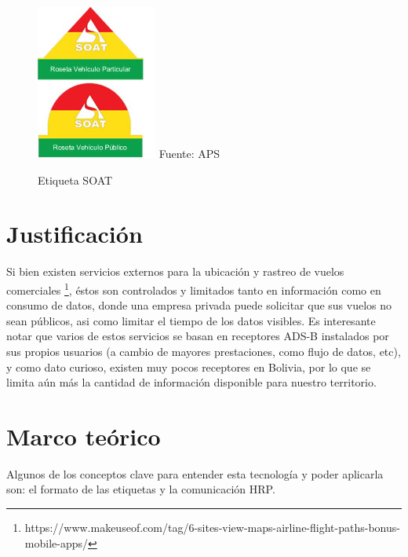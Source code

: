\documentclass[fleqn,10pt]{SelfArx} %
\begin{document}
\begin{figure}[ht]
\caption{Etiqueta SOAT}
\centering
\includegraphics[width=0.6\linewidth]{roseta_soat.jpg}
\newline Fuente: APS
\label{fig:roseta_soat}
\end{figure}

\section{Justificación}

Si bien existen servicios externos para la ubicación y rastreo de vuelos comerciales \footnote{https://www.makeuseof.com/tag/6-sites-view-maps-airline-flight-paths-bonus-mobile-apps/}, éstos son controlados y limitados tanto en información como en consumo de datos, donde una empresa privada puede solicitar que sus vuelos no sean públicos, asi como limitar el tiempo de los datos visibles. Es interesante notar que varios de estos servicios se basan en receptores ADS-B instalados por sus propios usuarios (a cambio de mayores prestaciones, como flujo de datos, etc), y como dato curioso, existen muy pocos receptores en Bolivia, por lo que se limita aún más la cantidad de información disponible para nuestro territorio.


\section{Marco teórico}

Algunos de los conceptos clave para entender esta tecnología y poder aplicarla son: el formato de las etiquetas y la comunicación HRP.
\end{document}
